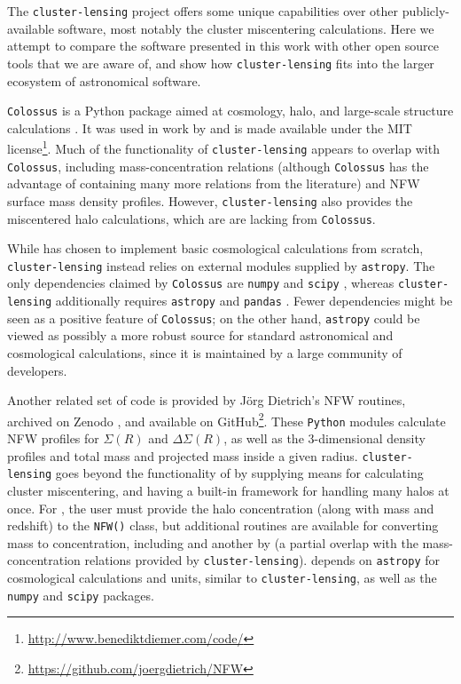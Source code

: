 \documentclass[twocolumn]{aastex6}
\newcommand{\code}{\lstinline[style=codeintext]}
\begin{document}
The \code{cluster-lensing} project offers some unique capabilities over other publicly-available software, most notably the cluster miscentering calculations. Here we attempt to compare the software presented in this work with other open source tools that we are aware of, and show how \code{cluster-lensing} fits into the larger ecosystem of astronomical software.

\code{Colossus} is a Python package aimed at cosmology, halo, and large-scale structure calculations \citep{ColossusCode}. It was used in work by \citet{Diemer15} and is made available under the MIT license\footnote{\url{http://www.benediktdiemer.com/code/}}. Much of the functionality of \code{cluster-lensing} appears to overlap with \code{Colossus}, including mass-concentration relations (although \code{Colossus} has the advantage of containing many more relations from the literature) and NFW surface mass density profiles. However, \code{cluster-lensing} also provides the miscentered halo calculations, which are are lacking from \code{Colossus}.

While \citet{ColossusCode} has chosen to implement basic cosmological calculations from scratch, \code{cluster-lensing} instead relies on external modules supplied by \code{astropy}.  The only dependencies claimed by \code{Colossus} are \code{numpy} \citep{NumPy} and \code{scipy} \citep{SciPy}, whereas \code{cluster-lensing} additionally requires \code{astropy} \citep{astropy13} and \code{pandas} \citep{Pandas}. Fewer dependencies might be seen as a positive feature of \code{Colossus}; on the other hand, \code{astropy} could be viewed as possibly a more robust source for standard astronomical and cosmological calculations, since it is maintained by a large community of developers.

Another related set of code is provided by J\"{o}rg Dietrich's NFW routines, archived on Zenodo \citep{DietrichNFW}, and available on GitHub\footnote{\url{https://github.com/joergdietrich/NFW}}. These \code{Python} modules calculate NFW profiles for $\Sigma(R)$ and $\Delta\Sigma(R)$, as well as the 3-dimensional density profiles and total mass and projected mass inside a given radius. \code{cluster-lensing} goes beyond the functionality of \citet{DietrichNFW} by supplying means for calculating cluster miscentering, and having a built-in framework for handling many halos at once. For \citet{DietrichNFW}, the user must provide the halo concentration (along with mass and redshift) to the \code{NFW()} class, but additional routines are available for converting mass to concentration, including \citet{Duffy08} and another by \citet{Dolag04} (a partial overlap with the mass-concentration relations provided by \code{cluster-lensing}). \citet{DietrichNFW} depends on \code{astropy} for cosmological calculations and units, similar to \code{cluster-lensing}, as well as the \code{numpy} and \code{scipy} packages.
\end{document}
